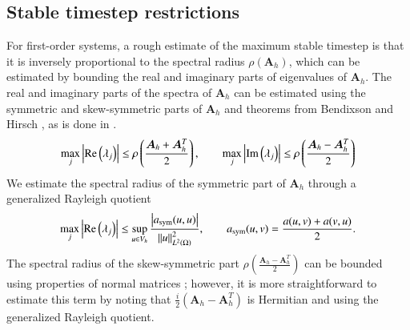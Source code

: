 \documentclass[preprint,10pt]{elsarticle}
\newcommand{\td}[2]{\frac{{\rm d}#1}{{\rm d}{\rm #2}}}
\newcommand{\nor}[1]{\left\| #1 \right\|}
\newcommand{\LRp}[1]{\left( #1 \right)}
\newcommand{\LRb}[1]{\left| #1 \right|}
\renewcommand{\L}{L^2\LRp{\Omega}}
\newcommand{\reviewerOne}[1]{#1}
\newcommand{\reviewerTwo}[1]{#1}
\begin{document}
\subsection{Stable timestep restrictions}
\label{sec:cfl}

\reviewerTwo{For first-order systems,} a rough estimate of the maximum stable timestep is that it is inversely proportional to the spectral radius $\rho(\bm{A}_h)$, which can be estimated by bounding the real and imaginary parts of eigenvalues of $\bm{A}_h$.  The real and imaginary parts of the spectra of $\bm{A}_h$ can be estimated using the symmetric and skew-symmetric parts of $\bm{A}_h$ and theorems from Bendixson and Hirsch \cite{marcus1992survey}, as is done in \cite{chan2015gpu}.  
\[
\max_j \reviewerOne{\LRb{{\rm Re}\LRp{\lambda_j}}} \leq \rho\LRp{\frac{\bm{A}_h+\bm{A}_h^T}{2}}, \qquad \max_j \reviewerOne{\LRb{{\rm Im}\LRp{\lambda_j}}} \leq \rho\LRp{\frac{\bm{A}_h-\bm{A}_h^T}{2}}
\]
We estimate the spectral radius of the symmetric part of $\bm{A}_h$ through a generalized Rayleigh quotient
\[
\max_j \reviewerOne{\LRb{{\rm Re}\LRp{\lambda_j}}} \leq \sup_{u \in V_h} \frac{\LRb{a_{\rm sym}(u,u)}}{\nor{u}^2_{\L}}, \qquad a_{\rm sym}(u,v) = \frac{a(u,v) + a(v,u)}{2}.  
\]
The spectral radius of the skew-symmetric part \reviewerTwo{$\rho\LRp{\frac{\bm{A}_h-\bm{A}_h^T}{2}}$} can be bounded using properties of normal matrices \cite{chan2015gpu}; however, it is more straightforward to estimate this term by noting that \reviewerTwo{$\frac{i}{2} \LRp{\bm{A}_h-\bm{A}_h^T}$} is Hermitian and using the generalized Rayleigh quotient.   
\end{document}
